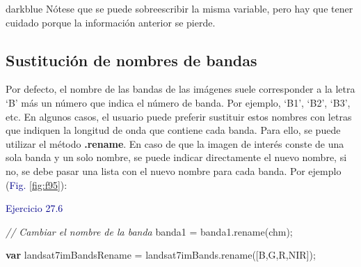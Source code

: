 \documentclass[
  12pt,
  letterpaper,
  twoside]{book}
\newenvironment{Shaded}{\begin{snugshade}}{\end{snugshade}}
\newcommand{\CommentTok}[1]{\textcolor[rgb]{0.24,0.58,0.00}{\textit{#1}}}
\newcommand{\FunctionTok}[1]{\textcolor[rgb]{0.48,0.12,0.64}{#1}}
\newcommand{\KeywordTok}[1]{\textcolor[rgb]{0.00,0.00,0.00}{\textbf{#1}}}
\newcommand{\NormalTok}[1]{#1}
\newcommand{\OperatorTok}[1]{\textcolor[rgb]{0.00,0.00,0.00}{#1}}
\newcommand{\StringTok}[1]{\textcolor[rgb]{0.87,0.29,0.22}{#1}}
\newcommand\boldpurple[1]{\textcolor{darkpurple}{\textbf{#1}}}
\begin{document}
\begin{bluebox2}

\begin{awesomeblock}{5pt}{\faLightbulb}{darkblue}
Nótese que se puede sobreescribir la misma variable, pero hay que tener cuidado porque la información anterior se pierde.

\end{awesomeblock}

\end{bluebox2}

\hypertarget{sustituciuxf3n-de-nombres-de-bandas}{%
\subsection*{Sustitución de nombres de bandas}\label{sustituciuxf3n-de-nombres-de-bandas}}

Por defecto, el nombre de las bandas de las imágenes suele corresponder a la letra `B' más un número que indica el número de banda. Por ejemplo, `B1', `B2', `B3', etc. En algunos casos, el usuario puede preferir sustituir estos nombres con letras que indiquen la longitud de onda que contiene cada banda. Para ello, se puede utilizar el método \boldpurple{.rename}. En caso de que la imagen de interés conste de una sola banda y un solo nombre, se puede indicar directamente el nuevo nombre, si no, se debe pasar una lista con el nuevo nombre para cada banda. Por ejemplo (\textcolor{darkblue}{Fig.} \ref{fig:f95}):

\textcolor{darkblue}{Ejercicio 27.6}

\begin{Shaded}
\begin{Highlighting}[]
\CommentTok{// Cambiar el nombre de la banda }
\NormalTok{banda1 }\OperatorTok{=}\NormalTok{ banda1}\OperatorTok{.}\FunctionTok{rename}\NormalTok{(}\StringTok{\textquotesingle{}chm\textquotesingle{}}\NormalTok{)}\OperatorTok{;}

\KeywordTok{var}\NormalTok{ landsat7imBandsRename }\OperatorTok{=}\NormalTok{ landsat7imBands}\OperatorTok{.}\FunctionTok{rename}\NormalTok{([}\StringTok{\textquotesingle{}B\textquotesingle{}}\OperatorTok{,}\StringTok{\textquotesingle{}G\textquotesingle{}}\OperatorTok{,}\StringTok{\textquotesingle{}R\textquotesingle{}}\OperatorTok{,}\StringTok{\textquotesingle{}NIR\textquotesingle{}}\NormalTok{])}\OperatorTok{;}
\end{Highlighting}
\end{Shaded}
\end{document}
